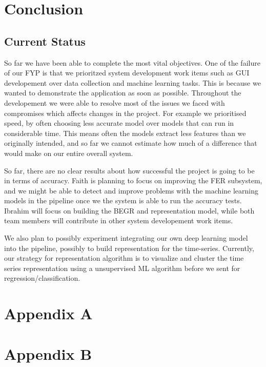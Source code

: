 \documentclass[12pt,a4paper,man]{report}
\begin{document}
\part{Conclusion}
\label{sec:org8cd391b}
\chapter{Current Status}
\label{sec:org942ab5c}
   So far we have been able to complete the most vital objectives. One of the failure of our FYP is that we prioritzed system development work items such as GUI developement over 
data collection and machine learning tasks. This is because we wanted to demonstrate the application as soon as possible.  
  Throughout the developement we were able to resolve most of the issues we faced with compromises which affects changes in the project. For example we prioritised speed, by often choosing less accurate model over models that can run in considerable time. This means often the models extract less features than we originally intended, and so far we cannot estimate how much of a difference that would make on our entire overall system.

So far, there are no clear results about how successful the project is going to be in terms of accuracy. Faith is planning to focus on improving the FER subsystem, and we might be able to detect and improve problems with the machine learning models in the pipeline once we the system is able to run the accuracy tests. Ibrahim will focus on building the BEGR and representation model, while both team members will contribute in other system developement work items.

We also plan to possibly experiment integrating our own deep learning model into the pipeline, possibly to build representation for the time-series. Currently, our strategy for representation algorithm is to visualize and cluster the time series representation using a unsupervised ML algorithm before we sent for regression/classification.

\part{Appendix A}
\label{sec:org7f6ae53}




\part{Appendix B}
\label{sec:org6acfc2e}
\end{document}
